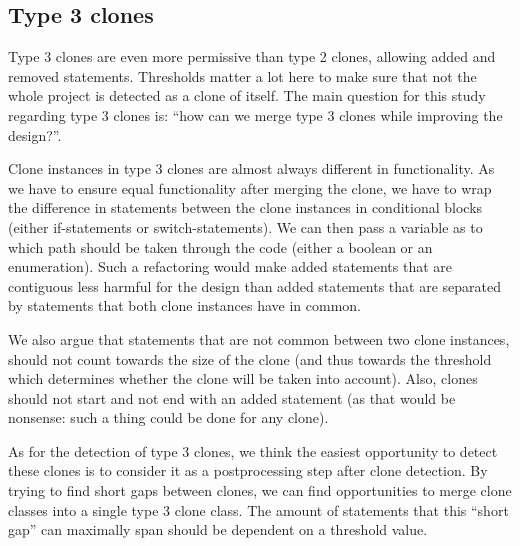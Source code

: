 \documentclass[a4paper]{article}
\begin{document}
\subsection{Type 3 clones}
Type 3 clones are even more permissive than type 2 clones, allowing added and removed statements. Thresholds matter a lot here to make sure that not the whole project is detected as a clone of itself. The main question for this study regarding type 3 clones is: ``how can we merge type 3 clones while improving the design?''.

Clone instances in type 3 clones are almost always different in functionality. As we have to ensure equal functionality after merging the clone, we have to wrap the difference in statements between the clone instances in conditional blocks (either if-statements or switch-statements). We can then pass a variable as to which path should be taken through the code (either a boolean or an enumeration). Such a refactoring would make added statements that are contiguous less harmful for the design than added statements that are separated by statements that both clone instances have in common.

We also argue that statements that are not common between two clone instances, should not count towards the size of the clone (and thus towards the threshold which determines whether the clone will be taken into account). Also, clones should not start and not end with an added statement (as that would be nonsense: such a thing could be done for any clone).

As for the detection of type 3 clones, we think the easiest opportunity to detect these clones is to consider it as a postprocessing step after clone detection. By trying to find short gaps between clones, we can find opportunities to merge clone classes into a single type 3 clone class. The amount of statements that this ``short gap'' can maximally span should be dependent on a threshold value.
\end{document}
